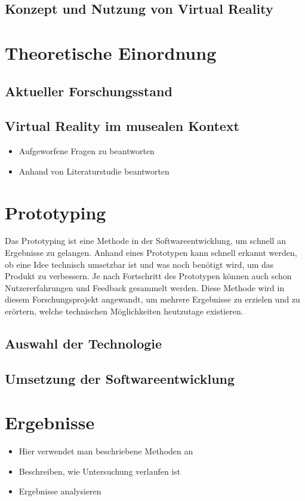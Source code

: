\documentclass[a4paper,12pt,oneside]{article}
\begin{document}
    \subsection{Konzept und Nutzung von Virtual Reality}
      
  \section{Theoretische Einordnung}
    \subsection{Aktueller Forschungsstand}
    \subsection{Virtual Reality im musealen Kontext}
      \begin{itemize}
        \item Aufgeworfene Fragen zu beantworten
        \item Anhand von Literaturstudie beantworten
      \end{itemize}
  \section{Prototyping}
    Das Prototyping ist eine Methode in der Softwareentwicklung, um schnell an
    Ergebnisse zu gelangen. Anhand eines Prototypen kann schnell erkannt werden,
    ob eine Idee technisch umsetzbar ist und was noch benötigt wird, um das Produkt
    zu verbessern. Je nach Fortschritt des Prototypen können auch schon Nutzererfahrungen
    und Feedback gesammelt werden.
    Diese Methode wird in diesem Forschungsprojekt angewandt, um mehrere Ergebnisse
    zu erzielen und zu erörtern, welche technischen Möglichkeiten heutzutage existieren.
    \subsection{Auswahl der Technologie}
    
    \subsection{Umsetzung der Softwareentwicklung}
  \section{Ergebnisse}
    \begin{itemize}
      \item Hier verwendet man beschriebene Methoden an
      \item Beschreiben, wie Untersuchung verlaufen ist
      \item Ergebnisse analysieren
    \end{itemize}
\end{document}
